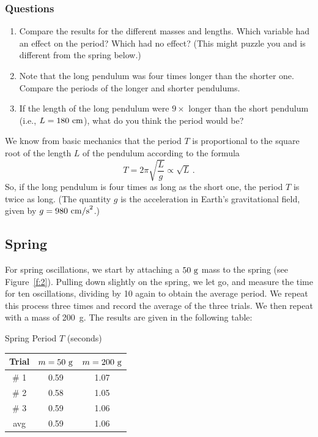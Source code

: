 \documentclass[11pt]{NSF}
\def\be{\begin{equation}}
\def\ee{\end{equation}}
\def\ben{\begin{enumerate}}
\def\een{\end{enumerate}}
\def\i{\item{}}
\begin{document}
\subsubsection*{Questions}
%
\ben
\i Compare the results for the different masses and lengths. 
Which variable had an effect on the period? Which had no effect? 
(This might puzzle you and is different from the spring below.)

\i Note that the long pendulum was four times longer than the shorter one. 
Compare the periods of the longer and shorter pendulums.

\i If the length of the long pendulum were $9\times$ longer 
than the short pendulum (i.e., $L=180~{\rm cm}$), what do you think
the period would be?
\een

We know from basic mechanics that the period $T$ is proportional 
to the square root of the length $L$ of the pendulum according to the formula
\be
T=2\pi\sqrt{\frac{L}{g}}\propto \sqrt{L}\,.
\ee
So, if the long pendulum is four times as long as the short one, 
the period $T$ is twice as long. 
(The quantity $g$ is the acceleration in Earth’s gravitational field, 
given by $g = 980~{\rm cm/s}^2$.)

\subsection{Spring}

For spring oscillations, we start by attaching a 
$50~{\rm g}$ mass to the spring (see Figure~\ref{f:2}).
Pulling down slightly on the spring, we let go, and measure the time for ten 
oscillations, dividing by 10 again to obtain the average period.
We repeat this process three times and record the average of the three trials.
We then repeat with a mass of 200~g.
The results are given in the following table:
%
\begin{table}[hbtp]
\begin{center}
Spring Period $T$ (seconds)\\
\begin{tabular}{| c | c | c | }
\hline
Trial & $m=50~{\rm g}$ & $m=200~{\rm g}$ \\
\hline
\# 1 & 0.59 & 1.07 \\
\hline
\# 2 & 0.58 & 1.05  \\
\hline
\# 3 & 0.59 & 1.06 \\
\hline
avg  & 0.59 & 1.06 \\
\hline
\end{tabular}
\label{t:2}
\end{center}
\end{table}
%
\end{document}
